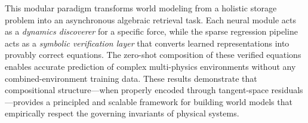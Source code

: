 \documentclass[twoside,11pt]{article}
\begin{document}
This modular paradigm transforms world modeling from a holistic storage problem into an asynchronous algebraic retrieval task. Each neural module acts as a \emph{dynamics discoverer} for a specific force, while the sparse regression pipeline acts as a \emph{symbolic verification layer} that converts learned representations into provably correct equations. The zero-shot composition of these verified equations enables accurate prediction of complex multi-physics environments without any combined-environment training data. These results demonstrate that compositional structure---when properly encoded through tangent-space residuals---provides a principled and scalable framework for building world models that empirically respect the governing invariants of physical systems.


\end{document}
